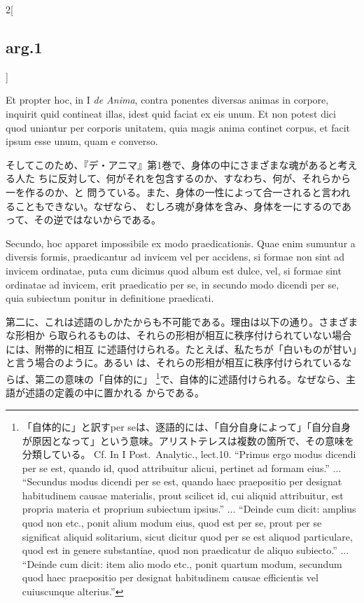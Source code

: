 \documentclass[paper=a4paper,fontsize=10pt,jafontsize=9pt,titlepage]{jlreq}
\begin{document}
\begin{paracol}{2}[\subsection{arg.1}]
\switchcolumn*

 Et propter hoc, in I {\itshape de Anima}, contra ponentes diversas animas in
corpore, inquirit quid contineat illas, idest quid faciat ex eis unum. Et non
potest dici quod uniantur per corporis unitatem, quia magis anima continet
corpus, et facit ipsum esse unum, quam e converso.

\switchcolumn

そしてこのため、『デ・アニマ』第1巻で、身体の中にさまざまな魂があると考える人た
ちに反対して、何がそれを包含するのか、すなわち、何が、それらから一を作るのか、と
問うている。また、身体の一性によって合一されると言われることもできない。なぜなら、
むしろ魂が身体を含み、身体を一にするのであって、その逆ではないからである。
 
\switchcolumn*

 Secundo, hoc apparet impossibile ex modo praedicationis. Quae enim sumuntur a
 diversis formis, praedicantur ad invicem vel per accidens, si formae non sint
 ad invicem ordinatae, puta cum dicimus quod album est dulce, vel, si formae
 sint ordinatae ad invicem, erit praedicatio per se, in secundo modo dicendi per
 se, quia subiectum ponitur in definitione praedicati.

\switchcolumn

第二に、これは述語のしかたからも不可能である。理由は以下の通り。さまざまな形相か
ら取られるものは、それらの形相が相互に秩序付けられていない場合には、附帯的に相互
に述語付けられる。たとえば、私たちが「白いものが甘い」と言う場合のように。あるい
は、それらの形相が相互に秩序付けられているならば、第二の意味の「自体的に」
\footnote{「自体的に」と訳すper seは、逐語的には、「自分自身によって」「自分自身
が原因となって」という意味。アリストテレスは複数の箇所で、その意味を分類している。
Cf. In I Post.~Analytic., lect.10. ``Primus ergo modus dicendi per se est,
quando id, quod attribuitur alicui, pertinet ad formam eius.'' ...  ``Secundus
modus dicendi per se est, quando haec praepositio per designat habitudinem
causae materialis, prout scilicet id, cui aliquid attribuitur, est propria
materia et proprium subiectum ipsius.''  ... ``Deinde cum dicit: amplius quod
non etc., ponit alium modum eius, quod est per se, prout per se significat
aliquid solitarium, sicut dicitur quod per se est aliquod particulare, quod est
in genere substantiae, quod non praedicatur de aliquo subiecto.'' ... ``Deinde
cum dicit: item alio modo etc., ponit quartum modum, secundum quod haec
praepositio per designat habitudinem causae efficientis vel cuiuscunque
alterius.''}で、自体的に述語付けられる。なぜなら、主語が述語の定義の中に置かれる
からである。
 

\end{paracol}
\end{document}
